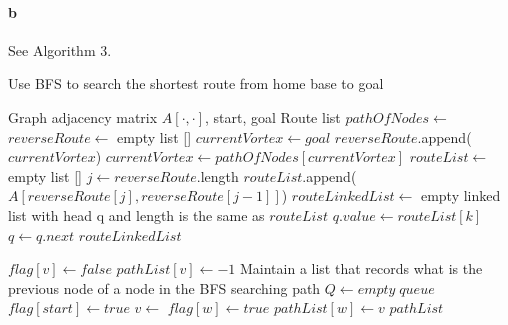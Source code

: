 \documentclass[paper=a4, fontsize=11pt]{scrartcl} %
\numberwithin{equation}{section} %
\numberwithin{figure}{section} %
\numberwithin{table}{section} %
\begin{document}
\paragraph{b} See Algorithm 3.
\begin{algorithm}
	\caption{Use BFS to search the shortest route from home base to goal}
	\begin{algorithmic}[1]
		\Require Graph adjacency matrix $A[\cdot,\cdot]$, start, goal
		\Ensure Route list
			\State $pathOfNodes\gets$
			\State $reverseRoute\gets$ empty list []
			\State $currentVortex\gets goal$
				\State $reverseRoute$.append($currentVortex$)
				\State $currentVortex\gets pathOfNodes[currentVortex]$
			\EndWhile
			\State $routeList\gets $empty list []
			\State $j\gets reverseRoute$.length
				$routeList$.append($A[reverseRoute[j],reverseRoute[j-1]]$)
            \EndWhile
            \State $routeLinkedList\gets$ empty linked list with head q and length is the same as $routeList$
                \State $q.value\gets routeList[k]$
                \State $q\gets q.next$
            \EndFor
			\State \Return $routeLinkedList$
		\EndFunction
        \State
        
				\State $flag[v]\gets false$
				\State $pathList[v]\gets -1$ \Comment Maintain a list that records what is the previous node of a node in the BFS searching path
			\EndFor
			\State $Q\gets empty\; queue$
			\State $flag[start]\gets true$
			\State {}
				\State $v\gets$ 
						\State $flag[w]\gets true$
						\State $pathList[w]\gets v$
						\State {}
					\EndIf
				\EndFor
			\EndWhile
			\State \Return $pathList$
		\EndFunction
	\end{algorithmic}		
\end{algorithm}
\end{document}
